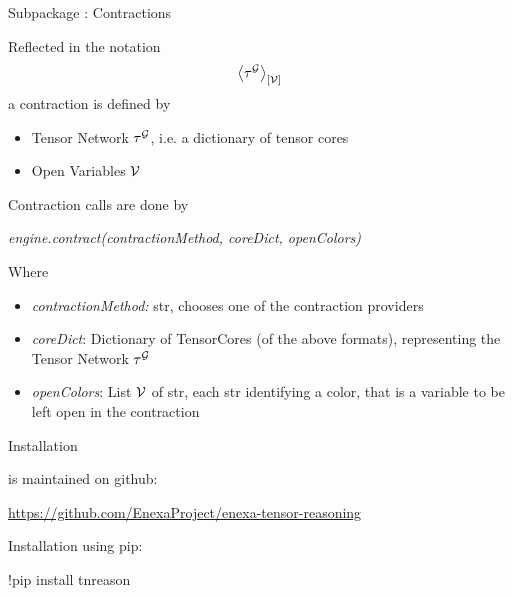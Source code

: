 \documentclass{beamer}
\begin{document}
\begin{frame}{Subpackage \spengine : Contractions}

Reflected in the notation
	\[ \left\langle \tau^{\mathcal{G}}\right\rangle_{\left[ \mathcal{V} \right]} \]
a contraction is defined by
\begin{itemize}
	\item Tensor Network $\tau^{\mathcal{G}}$, i.e. a dictionary of tensor cores
	\item Open Variables $\mathcal{V}$
\end{itemize}
Contraction calls are done by
\begin{centeredscript}
	\emph{engine.contract(contractionMethod, coreDict, openColors)}
\end{centeredscript}
Where
\begin{itemize}
	\item \emph{contractionMethod:} str, chooses one of the contraction providers
	\item \emph{coreDict}: Dictionary of TensorCores (of the above formats), representing the Tensor Network $\tau^{\mathcal{G}}$ 
	\item \emph{openColors}: List $\mathcal{V}$ of str, each str identifying a color, that is a variable to be left open in the contraction
\end{itemize}
\end{frame}






\begin{frame}{Installation}

\tnreason is maintained on github:
\begin{center}
	\href{https://github.com/EnexaProject/enexa-tensor-reasoning}{https://github.com/EnexaProject/enexa-tensor-reasoning}
\end{center}

Installation using pip:
\begin{centeredscript}
	!pip install tnreason
\end{centeredscript}





\end{frame}
\end{document}
